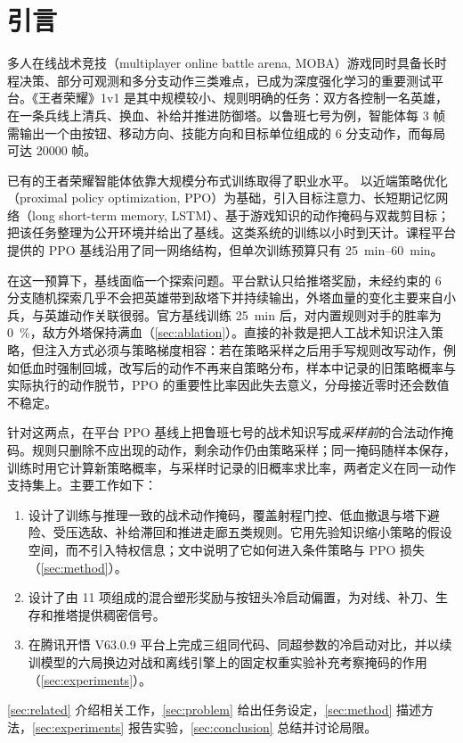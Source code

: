 \section{引言}
\label{sec:intro}

多人在线战术竞技（multiplayer online battle arena, MOBA）游戏同时具备长时程决策、部分可观测和多分支动作三类难点，已成为深度强化学习的重要测试平台\cite{berner2019dota,ye2020full}。《王者荣耀》1v1 是其中规模较小、规则明确的任务：双方各控制一名英雄，在一条兵线上清兵、换血、补给并推进防御塔\cite{ye2020mastering,wei2022hok}。以鲁班七号为例，智能体每 \num{3} 帧需输出一个由按钮、移动方向、技能方向和目标单位组成的 \num{6} 分支动作，而每局可达 \num{20000} 帧。

已有的王者荣耀智能体依靠大规模分布式训练取得了职业水平。\textcite{ye2020mastering} 以近端策略优化（proximal policy optimization, PPO）\cite{ppo2017}为基础，引入目标注意力、长短期记忆网络（long short-term memory, LSTM）、基于游戏知识的动作掩码与双裁剪目标；\textcite{wei2022hok} 把该任务整理为公开环境并给出了基线。这类系统的训练以小时到天计。课程平台提供的 PPO 基线沿用了同一网络结构，但单次训练预算只有 \qtyrange{25}{60}{\minute}。

在这一预算下，基线面临一个探索问题。平台默认只给推塔奖励，未经约束的 \num{6} 分支随机探索几乎不会把英雄带到敌塔下并持续输出，外塔血量的变化主要来自小兵，与英雄动作关联很弱。官方基线训练 \qty{25}{\minute} 后，对内置规则对手的胜率为 \qty{0}{\percent}，敌方外塔保持满血（\cref{sec:ablation}）。直接的补救是把人工战术知识注入策略，但注入方式必须与策略梯度相容：若在策略采样之后用手写规则改写动作，例如低血时强制回城，改写后的动作不再来自策略分布，样本中记录的旧策略概率与实际执行的动作脱节，PPO 的重要性比率因此失去意义，分母接近零时还会数值不稳定。

针对这两点，在平台 PPO 基线上把鲁班七号的战术知识写成\emph{采样前}的合法动作掩码。规则只删除不应出现的动作，剩余动作仍由策略采样；同一掩码随样本保存，训练时用它计算新策略概率，与采样时记录的旧概率求比率，两者定义在同一动作支持集上。主要工作如下：
\begin{enumerate}
  \item 设计了训练与推理一致的战术动作掩码，覆盖射程门控、低血撤退与塔下避险、受压选敌、补给滞回和推进走廊五类规则。它用先验知识缩小策略的假设空间，而不引入特权信息；文中说明了它如何进入条件策略与 PPO 损失（\cref{sec:method}）。
  \item 设计了由 \num{11} 项组成的混合塑形奖励与按钮头冷启动偏置，为对线、补刀、生存和推塔提供稠密信号。
  \item 在腾讯开悟 V63.0.9 平台上完成三组同代码、同超参数的冷启动对比，并以续训模型的六局换边对战和离线引擎上的固定权重实验补充考察掩码的作用（\cref{sec:experiments}）。
\end{enumerate}

\cref{sec:related} 介绍相关工作，\cref{sec:problem} 给出任务设定，\cref{sec:method} 描述方法，\cref{sec:experiments} 报告实验，\cref{sec:conclusion} 总结并讨论局限。
